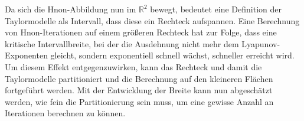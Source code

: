 Da sich die H\e non-Abbildung nun im $\mathbb{R}^2$ bewegt, bedeutet eine Definition der Taylormodelle als Intervall, dass diese ein Rechteck aufspannen. Eine Berechnung von H\e non-Iterationen auf einem größeren Rechteck hat zur Folge, dass eine kritische Intervallbreite, bei der die Ausdehnung nicht mehr dem Lyapunov-Exponenten gleicht, sondern exponentiell schnell wächst, schneller erreicht wird. Um diesem Effekt entgegenzuwirken, kann das Rechteck und damit die Taylormodelle partitioniert und die Berechnung auf den kleineren Flächen fortgeführt werden. Mit der Entwicklung der Breite kann nun abgeschätzt werden, wie fein die Partitionierung sein muss, um eine gewisse Anzahl an Iterationen berechnen zu können.
















 
